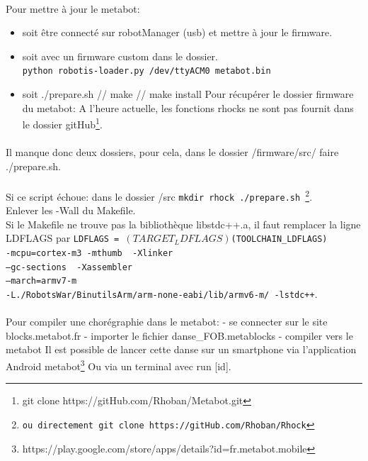 \documentclass[10pt,a4paper]{report}
\begin{document}
\begin{appendices}
\paragraph{}
Pour mettre à jour le metabot:
\begin{itemize}
\item soit être connecté sur robotManager (usb) et mettre à jour le firmware.
\item soit avec un firmware custom dans le dossier.\\
    \texttt{python robotis-loader.py /dev/ttyACM0 metabot.bin}
\item soit ./prepare.sh // make // make install
Pour récupérer le dossier firmware du metabot:
A l'heure actuelle, les fonctions rhocks ne sont pas fournit dans le dossier  gitHub\footnote{git clone https://gitHub.com/Rhoban/Metabot.git}.
\end{itemize}

\paragraph{}
Il manque donc deux dossiers, pour cela, dans le dossier /firmware/src/ faire ./prepare.sh.
\paragraph{}
Si ce script échoue: dans le dossier /src \texttt{mkdir rhock ./prepare.sh \footnote{ou directement git clone https://gitHub.com/Rhoban/Rhock}}. \\
Enlever les -Wall du Makefile.\\
Si le Makefile ne trouve pas la bibliothèque libstdc++.a, il faut remplacer la ligne LDFLAGS par  
\texttt{LDFLAGS = $(TARGET_LDFLAGS) $(TOOLCHAIN\_LDFLAGS)\\ 
-mcpu=cortex-m3 -mthumb \ -Xlinker\\ 
--gc-sections \ -Xassembler\\
--march=armv7-m \ \\
-L./RobotsWar/BinutilsArm/arm-none-eabi/lib/armv6-m/ -lstdc++}.
\paragraph{}
Pour compiler une chorégraphie dans le metabot:
- se connecter sur le site blocks.metabot.fr
- importer le fichier danse\_FOB.metablocks
- compiler vers le metabot
Il est possible de lancer cette danse sur un smartphone via l'application Android metabot\footnote{https://play.google.com/store/apps/details?id=fr.metabot.mobile} Ou via un terminal avec run [id].

\end{appendices}
\end{document}
